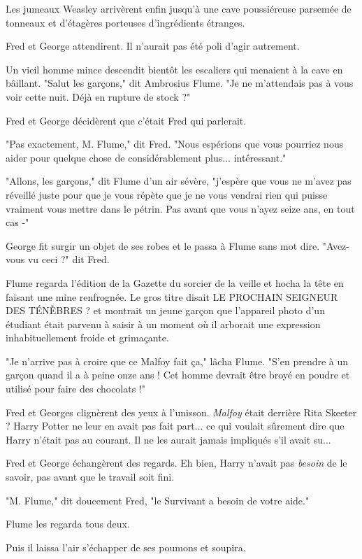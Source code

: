 Les jumeaux Weasley arrivèrent enfin jusqu'à une cave poussiéreuse parsemée de tonneaux et d'étagères porteuses d'ingrédients étranges.

Fred et George attendirent. Il n'aurait pas été poli d'agir autrement.

Un vieil homme mince descendit bientôt les escaliers qui menaient à la cave en bâillant. "Salut les garçons," dit Ambrosius Flume. "Je ne m'attendais pas à vous voir cette nuit. Déjà en rupture de stock ?"

Fred et George décidèrent que c'était Fred qui parlerait.

"Pas exactement, M. Flume," dit Fred. "Nous espérions que vous pourriez nous aider pour quelque chose de considérablement plus... intéressant."

"Allons, les garçons," dit Flume d'un air sévère, "j'espère que vous ne m'avez pas réveillé juste pour que je vous répète que je ne vous vendrai rien qui puisse vraiment vous mettre dans le pétrin. Pas avant que vous n'ayez seize ans, en tout cas -"

George fit surgir un objet de ses robes et le passa à Flume sans mot dire. "Avez-vous vu ceci ?" dit Fred.

Flume regarda l'édition de la Gazette du sorcier de la veille et hocha la tête en faisant une mine renfrognée. Le gros titre disait LE PROCHAIN SEIGNEUR DES TÉNÈBRES ? et montrait un jeune garçon que l'appareil photo d'un étudiant était parvenu à saisir à un moment où il arborait une expression inhabituellement froide et grimaçante.

"Je n'arrive pas à croire que ce Malfoy fait ça," lâcha Flume. "S'en prendre à un garçon quand il a à peine onze ans ! Cet homme devrait être broyé en poudre et utilisé pour faire des chocolats !"

Fred et Georges clignèrent des yeux à l'unisson. \emph{Malfoy} était derrière Rita Skeeter ? Harry Potter ne leur en avait pas fait part... ce qui voulait sûrement dire que Harry n'était pas au courant. Il ne les aurait jamais impliqués s'il avait su...

Fred et George échangèrent des regards. Eh bien, Harry n'avait pas \emph{besoin} de le savoir, pas avant que le travail soit fini.

"M. Flume," dit doucement Fred, "le Survivant a besoin de votre aide."

Flume les regarda tous deux.

Puis il laissa l'air s'échapper de ses poumons et soupira.

